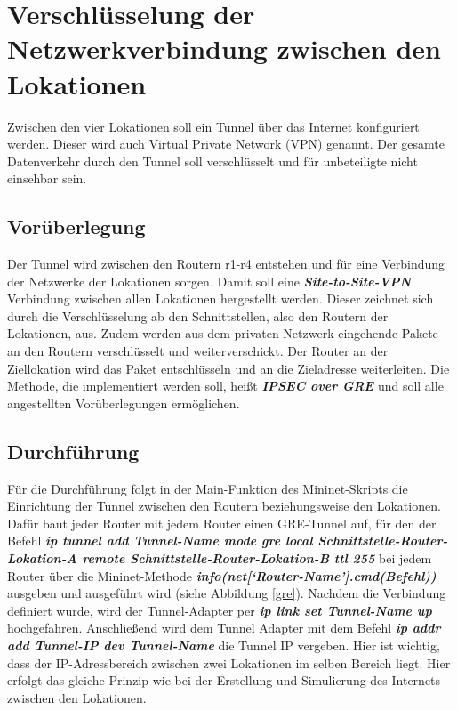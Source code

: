 \documentclass[fontsize=12pt,paper=a4,open=any,parskip=half,
  twoside=false,toc=listof,toc=bibliography,fleqn,leqno,
  captions=nooneline,captions=tableabove,british]{scrbook}
\begin{document}
\section{Verschlüsselung der Netzwerkverbindung zwischen den Lokationen}
Zwischen den vier Lokationen soll ein Tunnel über das Internet konfiguriert werden. Dieser wird auch Virtual Private Network (VPN) genannt. Der gesamte Datenverkehr durch den Tunnel soll verschlüsselt und für unbeteiligte nicht einsehbar sein.

\subsection{Vorüberlegung}
Der Tunnel wird zwischen den Routern r1-r4 entstehen und für eine Verbindung der Netzwerke der Lokationen sorgen. Damit soll eine \textit{\textbf{Site-to-Site-VPN}} Verbindung zwischen allen Lokationen hergestellt werden. Dieser zeichnet sich durch die Verschlüsselung ab den Schnittstellen, also den Routern der Lokationen, aus. Zudem werden aus dem privaten Netzwerk eingehende Pakete an den Routern verschlüsselt und weiterverschickt. Der Router an der Ziellokation wird das Paket entschlüsseln und an die Zieladresse weiterleiten. Die Methode, die implementiert werden soll, heißt \textit{\textbf{IPSEC over GRE}} und soll alle angestellten Vorüberlegungen ermöglichen.

\subsection{Durchführung}
Für die Durchführung folgt in der Main-Funktion des Mininet-Skripts die Einrichtung der Tunnel zwischen den Routern beziehungsweise den Lokationen. Dafür baut jeder Router mit jedem Router einen GRE-Tunnel auf, für den der Befehl \textit{\textbf{ip tunnel add Tunnel-Name mode gre local Schnittstelle-Router-Lokation-A remote Schnittstelle-Router-Lokation-B ttl 255}} bei jedem Router über die Mininet-Methode \textit{\textbf{info(net[‘Router-Name'].cmd(Befehl))}} ausgeben und ausgeführt wird (siehe Abbildung \ref{gre}). Nachdem die Verbindung definiert wurde, wird der Tunnel-Adapter per \textit{\textbf{ip link set Tunnel-Name up}} hochgefahren. Anschließend wird dem Tunnel Adapter mit dem Befehl \textit{\textbf{ip addr add Tunnel-IP dev Tunnel-Name}} die Tunnel IP vergeben. Hier ist wichtig, dass der IP-Adressbereich zwischen zwei Lokationen im selben Bereich liegt. Hier erfolgt das gleiche Prinzip wie bei der Erstellung und Simulierung des Internets zwischen den Lokationen.
\end{document}
